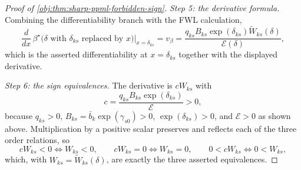 \documentclass[11pt]{article}
\begin{document}
\begin{proof}[Proof of \cref{obj:thm:sharp-ppml-forbidden-sign}]
\textit{Step 5: the derivative formula.} Combining the differentiability branch with the FWL calculation,
\[
\frac{d}{dx}\,\beta^\star\!\bigl(\delta\text{ with }\delta_{ks}\text{ replaced by }x\bigr)\Big|_{x=\delta_{ks}}
=
v_\beta
=
\frac{q_{ks}B_{ks}\exp(\delta_{ks})\widetilde W_{ks}(\delta)}{\mathcal E(\delta)} ,
\]
which is the asserted differentiability at \(x=\delta_{ks}\) together with the displayed derivative.

\textit{Step 6: the sign equivalences.} The derivative is \(cW_{ks}\) with
\[
c=\frac{q_{ks}B_{ks}\exp(\delta_{ks})}{\mathcal E}>0,
\]
because \(q_{ks}>0\), \(B_{ks}=\bar b_k\exp(\gamma_{s0})>0\), \(\exp(\delta_{ks})>0\), and \(\mathcal E>0\) as shown above. Multiplication by a positive scalar preserves and reflects each of the three order relations, so
\[
cW_{ks}<0\iff W_{ks}<0,
\qquad
cW_{ks}=0\iff W_{ks}=0,
\qquad
0<cW_{ks}\iff 0<W_{ks},
\]
which, with \(W_{ks}=\widetilde W_{ks}(\delta)\), are exactly the three asserted equivalences.
\end{proof}
\end{document}
